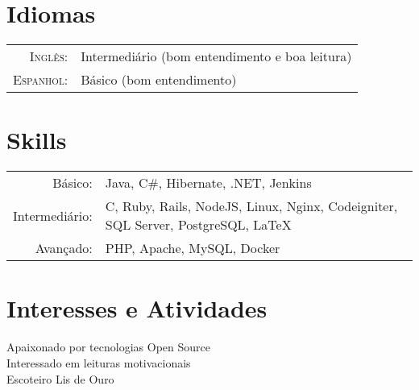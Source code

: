 \documentclass[a4paper,10pt]{article}
\begin{document}
\section{Idiomas}
\begin{tabular}{rl}
\textsc{Inglês:}&Intermediário (bom entendimento e boa leitura)\\
\textsc{Espanhol:}&Básico (bom entendimento)\\
\end{tabular}

\section{Skills}
\begin{tabular}{rl}
 Básico:& Java, C\#, Hibernate, .NET, Jenkins \setmainfont[SmallCapsFont=Fontin-SmallCaps.otf]{Fontin.otf}\\
 Intermediário:& C, Ruby, Rails, NodeJS, Linux, Nginx, Codeigniter, SQL Server, PostgreSQL, \LaTeX \\
 Avançado:& PHP, Apache, MySQL, Docker 
\end{tabular}

\section{Interesses e Atividades}
Apaixonado por tecnologias Open Source\\
Interessado em leituras motivacionais \\
Escoteiro Lis de Ouro \\
\end{document}
